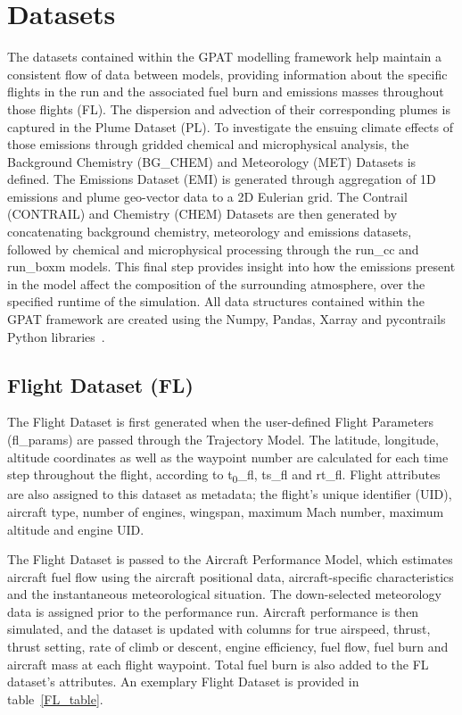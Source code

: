 \section{Datasets}
The datasets contained within the GPAT modelling framework help maintain a consistent flow of data between models, providing information about the specific flights in the run and the associated fuel burn and emissions masses throughout those flights (FL). The dispersion and advection of their corresponding plumes is captured in the Plume Dataset (PL). To investigate the ensuing climate effects of those emissions through gridded chemical and microphysical analysis, the Background Chemistry (BG\_CHEM) and Meteorology (MET) Datasets is defined. The Emissions Dataset (EMI) is generated through aggregation of 1D emissions and plume geo-vector data to a 2D Eulerian grid. The Contrail (CONTRAIL) and Chemistry (CHEM) Datasets are then generated by concatenating background chemistry, meteorology and emissions datasets, followed by chemical and microphysical processing through the run\_cc and run\_boxm models. This final step provides insight into how the emissions present in the model affect the composition of the surrounding atmosphere, over the specified runtime of the simulation. All data structures contained within the GPAT framework are created using the Numpy, Pandas, Xarray and pycontrails Python libraries~\cite{Numpy2020, Pandas2024, Xarray2024, pycontrails2024}. 

\subsection{Flight Dataset (FL)}
The Flight Dataset is first generated when the user-defined Flight Parameters (fl\_params) are passed through the Trajectory Model. The latitude, longitude, altitude coordinates as well as the waypoint number are calculated for each time step throughout the flight, according to t\textsubscript{0}\_fl, ts\_fl and rt\_fl. Flight attributes are also assigned to this dataset as metadata; the flight's unique identifier (UID), aircraft type, number of engines, wingspan, maximum Mach number, maximum altitude and engine UID.

The Flight Dataset is passed to the Aircraft Performance Model, which estimates aircraft fuel flow using the aircraft positional data, aircraft-specific characteristics and the instantaneous meteorological situation. The down-selected meteorology data is assigned prior to the performance run. Aircraft performance is then simulated, and the dataset is updated with columns for true airspeed, thrust, thrust setting, rate of climb or descent, engine efficiency, fuel flow, fuel burn and aircraft mass at each flight waypoint. Total fuel burn is also added to the FL dataset's attributes. An exemplary Flight Dataset is provided in table~\ref{FL_table}. 

